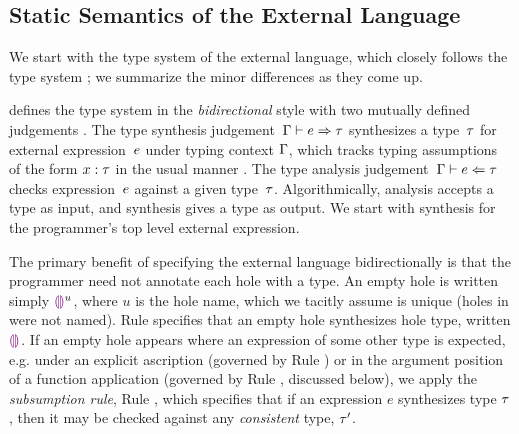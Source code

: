 
\subsection{Static Semantics of the External Language}
\label{sec:external-statics}



We start with the type system of the \HazelnutLive external language,
which closely follows the \Hazelnut type system \cite{popl-paper}; we summarize the minor differences as they come up.


 defines the type system in the \emph{bidirectional} style
%
with two mutually defined judgements \cite{Pierce:2000ve,bidi-tutorial,DBLP:conf/icfp/DunfieldK13,Chlipala:2005da}. The type synthesis
judgement~$\Gamma \vdash e \Rightarrow \tau$ synthesizes a type~$\tau$
for external expression~$e$ under typing context $\Gamma$, which tracks typing
assumptions of the form $x : \tau$ in the usual
manner \cite{pfpl,tapl}.
%
The type analysis judgement~$\Gamma \vdash e \Leftarrow \tau$ checks
expression~$e$ against a given type~$\tau$.
%
Algorithmically, analysis accepts a type as input, and synthesis gives
a type as output.
%
We start with synthesis for the programmer's top level external
expression.


The primary benefit of specifying the \HazelnutLive external language
bidirectionally is that the programmer need not annotate each hole with a type.
%
An empty hole is
written simply $\textcolor{violet}{\llparenthesis}\textcolor{violet}{\rrparenthesis}^{u}$, where $u$ is the hole name, which we tacitly assume is unique
(holes in \Hazelnut were not named).
Rule  specifies that an empty hole synthesizes hole type, written $\textcolor{violet}{\llparenthesis}\textcolor{violet}{\rrparenthesis}$.
%
If an empty hole appears where an expression of some other type is
expected, e.g. under an explicit ascription (governed by Rule )
or in the argument position of a function application (governed by
Rule , discussed below), we apply the \emph{subsumption rule},
Rule , which specifies that if an expression $e$ synthesizes
type $\tau$, then it may be checked against any \emph{consistent}
type, $\tau'$.


